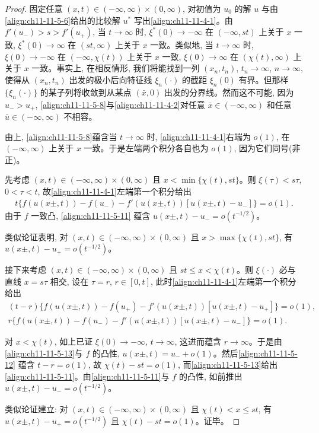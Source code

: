 \documentclass[../../main.tex]{subfiles}
\begin{document}
\begin{proof}
固定任意 $(x,t)\in(-\infty,\infty)\times(0,\infty)$, 对初值为 $u_0$ 的解 $u$ 与由\eqref{align:ch11-11-5-6}给出的比较解 $u^*$ 写出\eqref{align:ch11-11-4-1}。由 $f'(u_-)>s>f'(u_+)$, 当 $t\to\infty$ 时, $\xi^*(0)\to-\infty$ 在 $(-\infty,st)$ 上关于 $x$ 一致, $\xi^*(0)\to\infty$ 在 $(st,\infty)$ 上关于 $x$ 一致。类似地, 当 $t\to\infty$ 时, $\xi(0)\to-\infty$ 在 $(-\infty,\chi(t))$ 上关于 $x$ 一致, $\xi(0)\to\infty$ 在 $(\chi(t),\infty)$ 上关于 $x$ 一致。事实上, 在相反情形, 我们将能找到一列 $(x_n,t_n)$, $t_n\to\infty$, $n\to\infty$, 使得从 $(x_n,t_n)$ 出发的极小后向特征线 $\xi_n(\cdot)$ 的截距 $\xi_n(0)$ 有界。但那样 $\{\xi_n(\cdot)\}$ 的某子列将收敛到从某点 $(\bar x,0)$ 出发的分界线。然而这不可能, 因为 $u_->u_+$, \eqref{align:ch11-11-5-8}与\eqref{align:ch11-11-4-2}对任意 $\bar x\in(-\infty,\infty)$ 和任意 $\bar u\in(-\infty,\infty)$ 不相容。

由上, \eqref{align:ch11-11-5-8}蕴含当 $t\to\infty$ 时, \eqref{align:ch11-11-4-1}右端为 $o(1)$, 在 $(-\infty,\infty)$ 上关于 $x$ 一致。于是左端两个积分各自也为 $o(1)$, 因为它们同号(非正)。

先考虑 $(x,t)\in(-\infty,\infty)\times(0,\infty)$ 且 $x<\min\{\chi(t),st\}$。则 $\xi(\tau)<s\tau$, $0<\tau<t$, 故\eqref{align:ch11-11-4-1}左端第一个积分给出
\begin{align}
t\{f(u(x\pm,t))-f(u_-)-f'(u(x\pm,t))[u(x\pm,t)-u_-]\}=o(1).\label{align:ch11-11-5-11}
\end{align}
由于 $f$ 一致凸, \eqref{align:ch11-11-5-11} 蕴含 $u(x\pm,t)-u_-=o(t^{-1/2})$。

类似论证表明, 对 $(x,t)\in(-\infty,\infty)\times(0,\infty)$ 且 $x>\max\{\chi(t),st\}$, 有 $u(x\pm,t)-u_+=o(t^{-1/2})$。

接下来考虑 $(x,t)\in(-\infty,\infty)\times(0,\infty)$ 且 $st\leqslant x<\chi(t)$。则 $\xi(\cdot)$ 必与直线 $x=s\tau$ 相交, 设在 $\tau=r$, $r\in[0,t]$, 此时\eqref{align:ch11-11-4-1}左端第一个积分给出
\begin{align}
(t-r)\{f(u(x\pm,t))-f(u_+)-f'(u(x\pm,t))[u(x\pm,t)-u_+]\}=o(1),\label{align:ch11-11-5-12}\\
r\{f(u(x\pm,t))-f(u_-)-f'(u(x\pm,t))[u(x\pm,t)-u_-]\}=o(1).\label{align:ch11-11-5-13}
\end{align}

对 $x<\chi(t)$, 如上已证 $\xi(0)\to-\infty$, $t\to\infty$, 这进而蕴含 $r\to\infty$。于是由\eqref{align:ch11-11-5-13}与 $f$ 的凸性, $u(x\pm,t)=u_-+o(1)$。然后\eqref{align:ch11-11-5-12} 蕴含 $t-r=o(1)$, 故 $\chi(t)-st=o(1)$, 而\eqref{align:ch11-11-5-13}给出\eqref{align:ch11-11-5-11}。由\eqref{align:ch11-11-5-11}与 $f$ 的凸性, 如前推出 $u(x\pm,t)-u_-=o(t^{-1/2})$。

类似论证建立: 对 $(x,t)\in(-\infty,\infty)\times(0,\infty)$ 且 $\chi(t)<x\leqslant st$, 有 $u(x\pm,t)-u_+=o(t^{-1/2})$ 且 $\chi(t)-st=o(1)$。证毕。
\end{proof}
\end{document}
